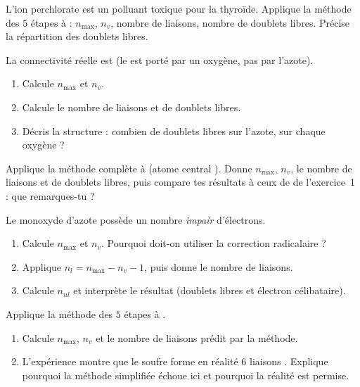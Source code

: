 \documentclass[11pt,a4paper]{article}
\begin{document}
\begin{exo}
L'ion perchlorate est un polluant toxique pour la thyroïde. Applique la méthode des $5$ étapes à
 : $n_{\max}$, $n_v$, nombre de liaisons, nombre de doublets libres. Précise la
répartition des doublets libres.
\end{exo}

\begin{exo}
La connectivité réelle est  (le  est porté par un oxygène, pas par l'azote).
\begin{enumerate}[label=\alph*)]
  \item Calcule $n_{\max}$ et $n_v$.
  \item Calcule le nombre de liaisons et de doublets libres.
  \item Décris la structure : combien de doublets libres sur l'azote, sur chaque oxygène ?
\end{enumerate}
\end{exo}

\begin{exo}
Applique la méthode complète à  (atome central ). Donne $n_{\max}$, $n_v$, le
nombre de liaisons et de doublets libres, puis compare tes résultats à ceux de  de
l'exercice~1 : que remarques-tu ?
\end{exo}

\begin{exo}
Le monoxyde d'azote  possède un nombre \emph{impair} d'électrons.
\begin{enumerate}[label=\alph*)]
  \item Calcule $n_{\max}$ et $n_v$. Pourquoi doit-on utiliser la correction radicalaire ?
  \item Applique $n_l = n_{\max} - n_v - 1$, puis donne le nombre de liaisons.
  \item Calcule $n_{nl}$ et interprète le résultat (doublets libres et électron célibataire).
\end{enumerate}
\end{exo}

\begin{exo}
Applique la méthode des $5$ étapes à .
\begin{enumerate}[label=\alph*)]
  \item Calcule $n_{\max}$, $n_v$ et le nombre de liaisons prédit par la méthode.
  \item L'expérience montre que le soufre forme en réalité $6$ liaisons . Explique
        pourquoi la méthode simplifiée échoue ici et pourquoi la réalité est permise.
\end{enumerate}
\end{exo}
\end{document}
